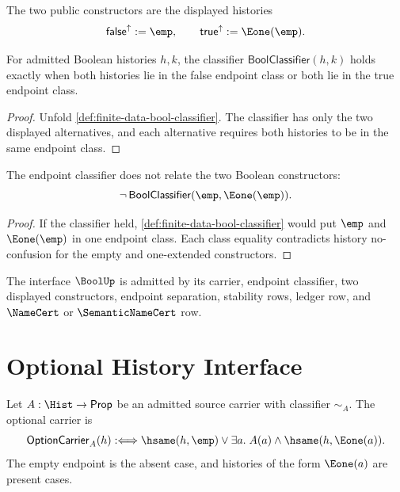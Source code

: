 \begin{definition}
\label{def:finite-data-bool-constructors}
The two public constructors are the displayed histories
$$
\mathsf{false}^{\uparrow}:=\emp,
\qquad
\mathsf{true}^{\uparrow}:=\Eone(\emp).
$$
\end{definition}

\begin{theorem}
\label{thm:finite-data-bool-endpoint-exactness}
For admitted Boolean histories $h,k$, the classifier
$\mathsf{BoolClassifier}(h,k)$ holds exactly when both histories lie in the
false endpoint class or both lie in the true endpoint class.
\end{theorem}

\begin{proof}
Unfold \autoref{def:finite-data-bool-classifier}.  The classifier has only
the two displayed alternatives, and each alternative requires both histories
to be in the same endpoint class.
\end{proof}

\begin{theorem}
\label{thm:finite-data-bool-constructor-separation}
The endpoint classifier does not relate the two Boolean constructors:
$$
\neg\,\mathsf{BoolClassifier}(\emp,\Eone(\emp)).
$$
\end{theorem}

\begin{proof}
If the classifier held, \autoref{def:finite-data-bool-classifier} would put
$\emp$ and $\Eone(\emp)$ in one endpoint class.  Each class equality
contradicts history no-confusion for the empty and one-extended
constructors.
\end{proof}

\begin{corollary}
\label{cor:finite-data-bool-admission}
The interface $\BoolUp$ is admitted by its carrier, endpoint classifier,
two displayed constructors, endpoint separation, stability rows, ledger row,
and $\NameCert$ or $\SemanticNameCert$ row.
\end{corollary}

\section{Optional History Interface}
\label{sec:finite-data-option-interface}

\begin{definition}
\label{def:finite-data-option-carrier}
Let $A:\Hist\to\mathsf{Prop}$ be an admitted source carrier with classifier
$\sim_A$.  The optional carrier is
$$
\mathsf{OptionCarrier}_A(h)
:\Longleftrightarrow
\hsame(h,\emp)
\vee
\exists a.\; A(a)\wedge\hsame(h,\Eone(a)).
$$
The empty endpoint is the absent case, and histories of the form
$\Eone(a)$ are present cases.
\end{definition}

